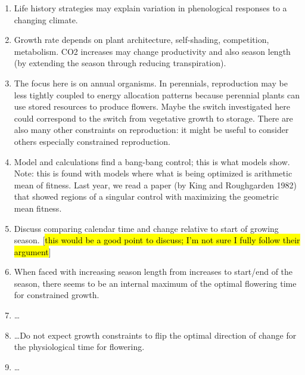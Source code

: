 \documentclass[12pt, oneside]{article}   	%
\begin{document}
\begin{enumerate}
\item Life history strategies may explain variation in phenological responses to a changing climate.
\item Growth rate depends on plant architecture, self-shading, competition, metabolism. CO2 increases may change productivity and also season length (by extending the season through reducing transpiration).
\item The focus here is on annual organisms. In perennials, reproduction may be less tightly coupled to energy allocation patterns because perennial plants can use stored resources to produce flowers. Maybe the switch investigated here could correspond to the switch from vegetative growth to storage. There are also many other constraints on reproduction: it might be useful to consider others especially constrained reproduction. 
\item Model and calculations find a bang-bang control; this is what models show. Note: this is found with models where what is being optimized is arithmetic mean of fitness. Last year, we read a paper (by King and Roughgarden 1982) that showed regions of a singular control with maximizing the geometric mean fitness.
\item Discuss comparing calendar time and change relative to start of growing season. [\hl{this would be a good point to discuss; I'm not sure I fully follow their argument}]
\item When faced with increasing season length from increases to start/end of the season, there seems to be an internal maximum of the optimal flowering time for constrained growth.
\item \dots
\item \dots Do not expect growth constraints to flip the optimal direction of change for the physiological time for flowering.
\item \dots
\end{enumerate}
\end{document}
